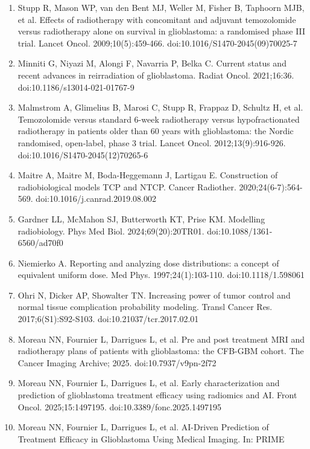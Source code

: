 \documentclass[
  11pt,
]{article}
\begin{document}
\begin{enumerate}
\def\labelenumi{\arabic{enumi}.}
\item
  Stupp R, Mason WP, van den Bent MJ, Weller M, Fisher B, Taphoorn MJB,
  et al. Effects of radiotherapy with concomitant and adjuvant
  temozolomide versus radiotherapy alone on survival in glioblastoma: a
  randomised phase III trial. Lancet Oncol. 2009;10(5):459-466.
  doi:10.1016/S1470-2045(09)70025-7
\item
  Minniti G, Niyazi M, Alongi F, Navarria P, Belka C. Current status and
  recent advances in reirradiation of glioblastoma. Radiat Oncol.
  2021;16:36. doi:10.1186/s13014-021-01767-9
\item
  Malmstrom A, Glimelius B, Marosi C, Stupp R, Frappaz D, Schultz H, et
  al. Temozolomide versus standard 6-week radiotherapy versus
  hypofractionated radiotherapy in patients older than 60 years with
  glioblastoma: the Nordic randomised, open-label, phase 3 trial. Lancet
  Oncol. 2012;13(9):916-926. doi:10.1016/S1470-2045(12)70265-6
\item
  Maitre A, Maitre M, Boda-Heggemann J, Lartigau E. Construction of
  radiobiological models TCP and NTCP. Cancer Radiother.
  2020;24(6-7):564-569. doi:10.1016/j.canrad.2019.08.002
\item
  Gardner LL, McMahon SJ, Butterworth KT, Prise KM. Modelling
  radiobiology. Phys Med Biol. 2024;69(20):20TR01.
  doi:10.1088/1361-6560/ad70f0
\item
  Niemierko A. Reporting and analyzing dose distributions: a concept of
  equivalent uniform dose. Med Phys. 1997;24(1):103-110.
  doi:10.1118/1.598061
\item
  Ohri N, Dicker AP, Showalter TN. Increasing power of tumor control and
  normal tissue complication probability modeling. Transl Cancer Res.
  2017;6(S1):S92-S103. doi:10.21037/tcr.2017.02.01
\item
  Moreau NN, Fournier L, Darrigues L, et al. Pre and post treatment MRI
  and radiotherapy plans of patients with glioblastoma: the CFB-GBM
  cohort. The Cancer Imaging Archive; 2025. doi:10.7937/v9pn-2f72
\item
  Moreau NN, Fournier L, Darrigues L, et al. Early characterization and
  prediction of glioblastoma treatment efficacy using radiomics and AI.
  Front Oncol. 2025;15:1497195. doi:10.3389/fonc.2025.1497195
\item
  Moreau NN, Fournier L, Darrigues L, et al. AI-Driven Prediction of
  Treatment Efficacy in Glioblastoma Using Medical Imaging. In: PRIME

\end{enumerate}
\end{document}

